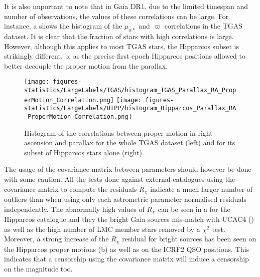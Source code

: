 It is also important to note that in Gaia DR1, due to 
the limited timespan and number of observations, the values of these correlations
can be large. For instance, a shows the
histogram of the $\mu_{\alpha *}$ and $\varpi$ correlations in the TGAS dataset. It is
clear that the fraction of stars with high correlations is large. However, although 
this applies to most TGAS stars, the Hipparcos subset is strikingly different, 
b, as the precise first epoch Hipparcos 
positions allowed to better decouple the proper motion from the parallax.

 \begin{figure}
 	\centering
   \texttt{[image: figures-statistics/LargeLabels/TGAS/histogram\_TGAS\_Parallax\_RA\_ProperMotion\_Correlation.png]}
   \texttt{[image: figures-statistics/LargeLabels/HIPP/histogram\_Hipparcos\_Parallax\_RA\_ProperMotion\_Correlation.png]}
   \caption{Histogram of the correlations between proper motion in right ascension and parallax 
   for the whole TGAS dataset (left)
   and for its subset of Hipparcos stars alone (right).\label{fig:pmra-pi-correlation}}
 \end{figure}

The usage of the {} covariance matrix between parameters should however be done with some caution. All the tests done against external catalogues using the covariance matrix to compute the residuals $R_\chi$ indicate a much larger number of outliers than when using only each astrometric parameter normalised residuals independently. The abnormally high values of $R_\chi$ can be seen in  a for the Hipparcos catalogue and they   the bright Gaia sources mis-match with UCAC4 () as well as the high number of LMC member stars removed by a $\chi^2$ test. 
Moreover, a strong increase of the $R_\chi$ residual for bright sources has been seen on the Hipparcos proper motions (b) as well as on the ICRF2 QSO positions. This indicates that a censorship using the covariance matrix will induce a censorship on the magnitude too.

